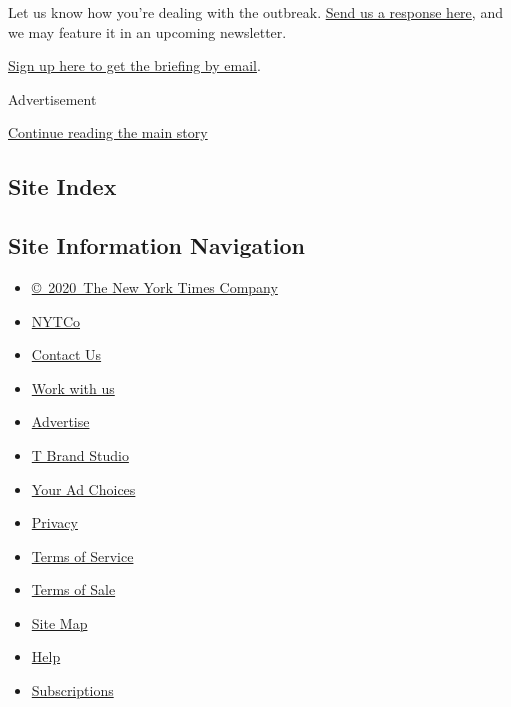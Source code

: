 Let us know how you're dealing with the outbreak.
\href{https://www.nytimes3xbfgragh.onion/2020/03/02/reader-center/coronavirus-preparation.html}{Send
us a response here}, and we may feature it in an upcoming newsletter.

\href{https://www.nytimes3xbfgragh.onion/newsletters/coronavirus-briefing}{Sign
up here to get the briefing by email}.

Advertisement

\protect\hyperlink{after-bottom}{Continue reading the main story}

\hypertarget{site-index}{%
\subsection{Site Index}\label{site-index}}

\hypertarget{site-information-navigation}{%
\subsection{Site Information
Navigation}\label{site-information-navigation}}

\begin{itemize}
\tightlist
\item
  \href{https://help.nytimes3xbfgragh.onion/hc/en-us/articles/115014792127-Copyright-notice}{©~2020~The
  New York Times Company}
\end{itemize}

\begin{itemize}
\tightlist
\item
  \href{https://www.nytco.com/}{NYTCo}
\item
  \href{https://help.nytimes3xbfgragh.onion/hc/en-us/articles/115015385887-Contact-Us}{Contact
  Us}
\item
  \href{https://www.nytco.com/careers/}{Work with us}
\item
  \href{https://nytmediakit.com/}{Advertise}
\item
  \href{http://www.tbrandstudio.com/}{T Brand Studio}
\item
  \href{https://www.nytimes3xbfgragh.onion/privacy/cookie-policy\#how-do-i-manage-trackers}{Your
  Ad Choices}
\item
  \href{https://www.nytimes3xbfgragh.onion/privacy}{Privacy}
\item
  \href{https://help.nytimes3xbfgragh.onion/hc/en-us/articles/115014893428-Terms-of-service}{Terms
  of Service}
\item
  \href{https://help.nytimes3xbfgragh.onion/hc/en-us/articles/115014893968-Terms-of-sale}{Terms
  of Sale}
\item
  \href{https://spiderbites.nytimes3xbfgragh.onion}{Site Map}
\item
  \href{https://help.nytimes3xbfgragh.onion/hc/en-us}{Help}
\item
  \href{https://www.nytimes3xbfgragh.onion/subscription?campaignId=37WXW}{Subscriptions}
\end{itemize}
